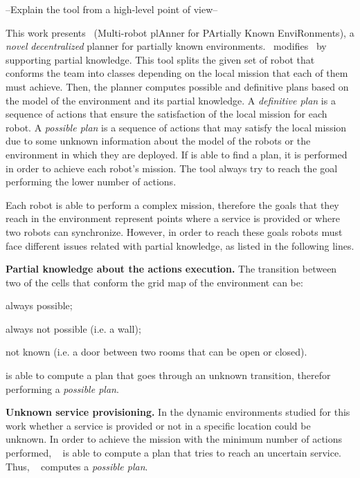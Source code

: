 --Explain the tool from a high-level point of view--

This work presents  \toolName\ (Multi-robot plAnner for PArtially Known EnviRonments), a \emph{novel} \emph{decentralized} planner for partially known environments.
\toolName\ modifies~\cite{tumova2016multi} by supporting partial knowledge.
This tool splits the given set of robot that conforms the team into classes depending on the local mission that each of them must achieve.
Then, the planner computes possible and definitive plans based on the model of the environment and its partial knowledge.
A \emph{definitive plan} is a sequence of actions that ensure the satisfaction of the local mission for each robot. 
A \emph{possible plan} is a sequence of actions that may satisfy the local mission due to some unknown information about the model of the robots or the environment in which they are deployed. 
If \toolName is able to find a plan, it is performed in order to achieve each robot's mission.
The tool always try to reach the goal performing the lower number of actions.

Each robot is able to perform a complex mission, therefore the goals that they reach in the environment represent points where a service is provided 
 or where two robots can synchronize.
However, in order to reach these goals robots must face different issues related with partial knowledge, as listed in the following lines.

\textbf{Partial knowledge about the actions execution.} 
The transition between two of the cells that conform the grid map of the environment can be:
\begin{enumerate*}
\item always possible;
\item always not possible (i.e. a wall);
\item not known (i.e. a door between two rooms that can be open or closed).
\end{enumerate*}
\toolName is able to compute a plan that goes through an unknown transition, therefor performing a \emph{possible plan}.

\textbf{Unknown service provisioning.} 
In the dynamic environments studied for this work whether a service is provided or not in a specific location could be unknown. 
In order to achieve the mission with the minimum number of actions performed, \toolName~ is able to compute a plan that tries to reach an uncertain service.
Thus, \toolName~ computes a \emph{possible plan}.


